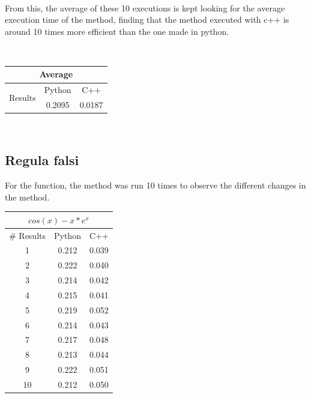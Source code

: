 \documentclass[conference]{IEEEtran}
\begin{document}
\ 


From this, the average of these 10 executions is kept looking for the average execution time of the method, finding that the method executed with c++ is around 10 times more efficient than the one made in python.

\



\begin{tabular}{|c|c|c|}
\hline
\multicolumn{3}{|c|}{Average}              \\ \hline
\multirow{2}{*}{Results} & Python & C++    \\ \cline{2-3} 
                         & 0.2095 & 0.0187 \\ \hline
\end{tabular}




\ 


\subsection{Regula falsi}

For the function, the method was run 10 times to observe the different changes in the method.


\begin{tabular}{|c|c|c|}
\hline
\multicolumn{3}{|c|}{\(cos(x)  -  x * e^x\)} \\ \hline
\# Results               & Python              & C++                \\ \hline
1                        & 0.212               & 0.039              \\ \hline
2                        & 0.222               & 0.040              \\ \hline
3                        & 0.214               & 0.042              \\ \hline
4                        & 0.215               & 0.041              \\ \hline
5                        & 0.219               & 0.052              \\ \hline
6                        & 0.214               & 0.043              \\ \hline
7                        & 0.217               & 0.048              \\ \hline
8                        & 0.213               & 0.044              \\ \hline
9                        & 0.222               & 0.051              \\ \hline
10                       & 0.212               & 0.050              \\ \hline
\end{tabular}
\end{document}
